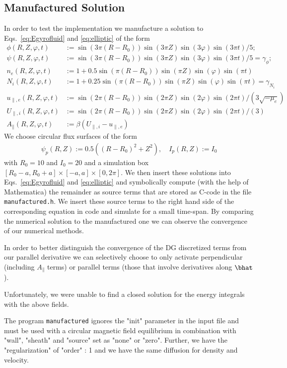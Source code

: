 \subsection{Manufactured Solution} \label{sec:manufactured}
In order to test the implementation we manufacture a solution to
Eqs.~\eqref{eq:Egyrofluid} and \eqref{eq:elliptic} of the form
\begin{align*}
\phi(R,Z,\varphi,t) &:= \sin(3\pi(R-R_0))\sin(3\pi Z)\sin(3\varphi)\sin(3\pi t)/5; \\
\psi(R,Z,\varphi,t) &:= \sin(3\pi(R-R_0))\sin(3\pi Z)\sin(3\varphi)\sin(3\pi t)/5 = \gamma_{\phi}; \\
n_e(R,Z,\varphi, t) &:= 1 + 0.5\sin(\pi(R-R_0))\sin(\pi Z)\sin(\varphi)\sin(\pi t) \\
{N_i}(R,Z,\varphi,t) &:= 1 + 0.25 \sin(\pi(R-R_0))\sin(\pi Z)\sin(\varphi)\sin(\pi t) = \gamma_{N_i} \\
u_{\parallel,e}(R,Z,\varphi, t) &:= \sin(2\pi(R-R_0))\sin(2\pi Z)\sin(2\varphi)\sin(2\pi t)/(3\sqrt{-\mu_e}) \\
U_{\parallel,i}(R,Z,\varphi, t) &:= \sin(2\pi(R-R_0))\sin(2\pi Z)\sin(2\varphi)\sin(2\pi t)/(3) \\
A_\parallel( R,Z,\varphi,t) &:= \beta( U_{\parallel,i} - u_{\parallel,e})
\end{align*}
We choose circular flux surfaces of the form
\begin{align*}
\psi_p(R,Z) :=0.5((R-R_0)^2 + Z^2),\quad
I_p(R,Z):=I_0
\end{align*}
with $R_0=10$ and $I_0=20$ and a simulation box
$[R_0-a,R_0+a]\times[-a,a]\times[0,2\pi]$.
We then insert these solutions into Eqs.~\eqref{eq:Egyrofluid} and
\eqref{eq:elliptic} and symbolically compute (with the help of Mathematica) the
remainder as source terms that are stored as C-code in the file
\texttt{manufactured.h}. We insert these source terms to the right hand
side of the corresponding equation in code and simulate for a small time-span.
By comparing the numerical solution to the manufactured one we can observe the
convergence of our numerical methods.
\begin{tcolorbox}[title=Note]
    In order to better distinguish the convergence of the DG discretized terms
    from our parallel derivative we can selectively choose to only activate
    perpendicular (including $A_\parallel$ terms) or parallel terms (those that
    involve derivatives along $\bhat$).
\end{tcolorbox}

Unfortunately, we were unable to find a closed solution for the energy integrals with the above fields.
\begin{tcolorbox}[title=Note]
    The program \texttt{manufactured} ignores the "init" parameter
    in the input file and must be used with a circular magnetic field equilibrium
    in combination with "wall", "sheath" and "source" set as "none" or "zero".
    Further, we have the "regularization" of "order" : 1 and we have the same
    diffusion for density and velocity.
\end{tcolorbox}

